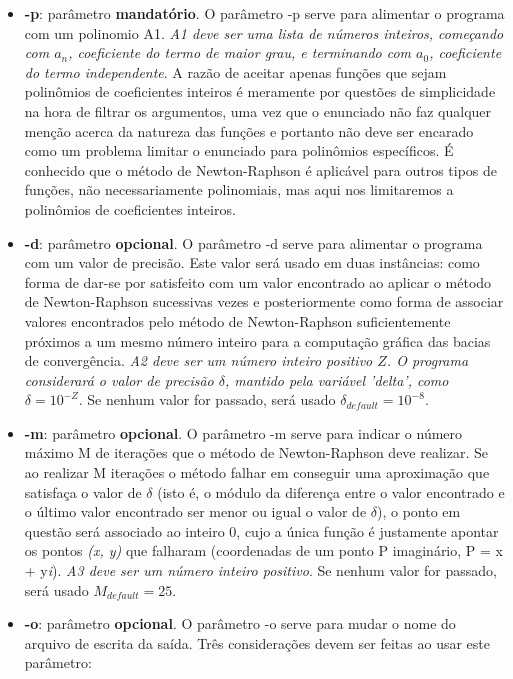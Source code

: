 \documentclass[11pt]{article}
\begin{document}
\begin{itemize}
  \item \textbf{-p}: parâmetro \textbf{mandatório}. O parâmetro -p serve para alimentar o programa com um polinomio A1. \textit{A1 deve ser uma lista de números inteiros, começando com $a_n$, coeficiente do termo
  de maior grau, e terminando com $a_0$, coeficiente do termo independente}. A razão de aceitar apenas funções que sejam polinômios de coeficientes inteiros é meramente por questões de simplicidade na hora de filtrar os argumentos,
  uma vez que o enunciado não faz qualquer menção acerca da natureza das funções e portanto não deve ser encarado como um problema limitar o enunciado para polinômios específicos. É conhecido que o método de Newton-Raphson é
  aplicável para outros tipos de funções, não necessariamente polinomiais, mas aqui nos limitaremos a polinômios de coeficientes inteiros.
  \item \textbf{-d}: parâmetro \textbf{opcional}. O parâmetro -d serve para alimentar o programa com um valor de precisão. Este valor será usado em duas instâncias: como forma de dar-se por satisfeito com um valor encontrado
  ao aplicar o método de Newton-Raphson sucessivas vezes e posteriormente como forma de associar valores encontrados pelo método de Newton-Raphson suficientemente próximos a um mesmo número inteiro para a computação gráfica das
  bacias de convergência. \textit{A2 deve ser um número inteiro positivo $Z$. O programa considerará o valor de precisão $\delta$, mantido pela variável 'delta', como $\delta = 10^{-Z}$}. Se nenhum valor for passado,
  será usado $\delta_{default} = 10^{-8}$.
  \item \textbf{-m}: parâmetro \textbf{opcional}. O parâmetro -m serve para indicar o número máximo M de iterações que o método de Newton-Raphson deve realizar. Se ao realizar M iterações o método falhar em conseguir uma aproximação
  que satisfaça o valor de $\delta$ (isto é, o módulo da diferença entre o valor encontrado e o último valor encontrado ser menor ou igual o valor de $\delta$), o ponto em questão será associado ao inteiro 0, cujo a única função
  é justamente apontar os pontos \textit{(x, y)} que falharam (coordenadas de um ponto P imaginário, P = x + y\textit{i}). \textit{A3 deve ser um número inteiro positivo}.  Se nenhum valor for passado,
  será usado $M_{default} = 25$.
  \item \textbf{-o}: parâmetro \textbf{opcional}. O parâmetro -o serve para mudar o nome do arquivo de escrita da saída. Três considerações devem ser feitas ao usar este parâmetro:

\end{itemize}
\end{document}
